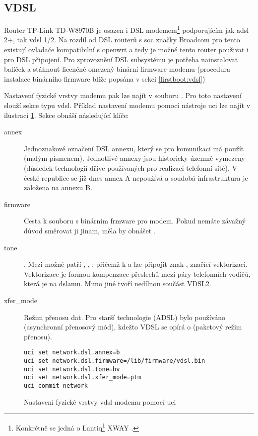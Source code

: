 \subsection{VDSL}
\label{net:vdsl}
Router TP-Link TD-W8970B je osazen i DSL modemem\footnote{
Konkrétně se jedná o Lantiq\footnote{Značka Lantiq dnes vystupuje jako součást značky Intel.}
XWAY .} podporujícím jak \gls{adsl} 2+,
tak \gls{vdsl} 1/2. Na rozdíl od DSL routerů s \gls{soc} značky Broadcom
pro tento existují ovladače kompatibilní s \gls{openwrt} a tedy je možné tento
router použivat i pro DSL připojení. Pro zprovoznění DSL subsystému je potřeba
nainstalovat balíček  a stáhnout licenčně omezený binární
firmware modemu (procedura instalace binárního firmware blíže popsána v
sekci \ref{firstboot:vdsl})

Nastavení fyzické vrstvy modemu pak lze najít v souboru .
Pro toto nastavení slouží sekce typu vdsl. Příklad nastavení modemu pomocí
nástroje uci lze najít v ilustraci \ref{net:vdsl:phy}. Sekce obnáší následující
klíče:
\begin{description}
\item[annex] Jednoznakové označení DSL annexu, který se pro komunikaci má
použít (malým písmenem). Jednotlivé annexy jsou historicky-územně vymezeny
(důsledek technologií dříve používaných pro realizaci telefonní sítě). V
české republice se již dnes annex A nepoužívá a soudobá infrastruktura je
založena na annexu B.
\item[firmware] Cesta k souboru s binárním frmware pro modem. Pokud nemáte
závažný důvod směrovat ji jinam, měla by obnášet .
\item[tone] . Mezi možné  patří , , ; přičemž
k   a  lze připojit znak , značící vektorizaci.
Vektorizace je formou kompenzace přeslechů mezi páry telefonních vodičů,
která je na \gls{dslam}u. Mimo jiné tvoří nedílnou součást VDSL2.
\item[xfer\_mode] Režim přenosu dat. Pro starší technologie (ADSL) bylo
používáno  (asynchronní přenosový mód), kdežto VDSL se opírá o 
(paketový režim přenosu).
\end{description}
\begin{figure}
\begin{lstlisting}
uci set network.dsl.annex=b
uci set network.dsl.firmware=/lib/firmware/vdsl.bin
uci set network.dsl.tone=bv
uci set network.dsl.xfer_mode=ptm
uci commit network
\end{lstlisting}
\caption{Nastavení fyzické vrstvy \gls{vdsl} modemu pomocí uci}
\label{net:vdsl:phy}
\end{figure}

